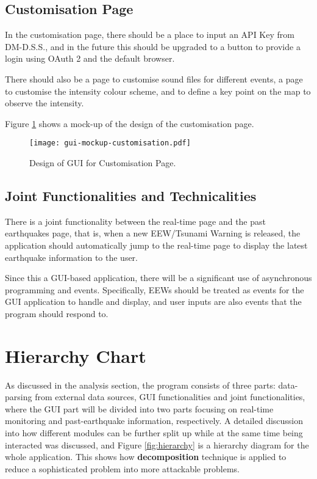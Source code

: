 \subsection{Customisation Page}

In the customisation page, there should be a place to input an API Key from DM-D.S.S., and in the future this should be upgraded to a button to provide a login using OAuth 2 and the default browser.

There should also be a page to customise sound files for different events, a page to customise the intensity colour scheme, and to define a key point on the map to observe the intensity.

Figure \ref{fig:gui-mockup-customisation} shows a mock-up of the design of the customisation page.

\begin{figure}[!ht]
    \centering
    \texttt{[image: gui-mockup-customisation.pdf]}
    \caption{Design of GUI for Customisation Page.}
    \label{fig:gui-mockup-customisation}
\end{figure}

\subsection{Joint Functionalities and Technicalities}

There is a joint functionality between the real-time page and the past earthquakes page, that is, when a new EEW/Tsunami Warning is released, the application should automatically jump to the real-time page to display the latest earthquake information to the user.

Since this a GUI-based application, there will be a significant use of asynchronous programming and events. Specifically, EEWs should be treated as events for the GUI application to handle and display, and user inputs are also events that the program should respond to.



\section{Hierarchy Chart}
As discussed in the analysis section, the program consists of three parts: data-parsing from external data sources, GUI functionalities and joint functionalities, where the GUI part will be divided into two parts focusing on real-time monitoring and past-earthquake information, respectively. A detailed discussion into how different modules can be further split up while at the same time being interacted was discussed, and Figure \ref{fig:hierarchy} is a hierarchy diagram for the whole application. This shows how \textbf{decomposition} technique is applied to reduce a sophisticated problem into more attackable problems.

